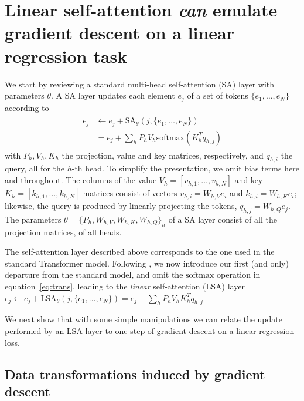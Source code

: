 \documentclass{article}
\newcommand{\sattn}{\text{SA}}
\newcommand{\lsattn}{\text{LSA}}
\def\eqref#1{equation~\ref{#1}}
\theoremstyle{plain}
\theoremstyle{definition}
\theoremstyle{remark}
\begin{document}
\section{Linear self-attention \textit{can} 
emulate gradient descent on a linear regression task}
\label{sect:construction}

We start by reviewing a standard multi-head self-attention (SA) layer with parameters $\theta$. A SA layer updates each element $e_j$ of a set of tokens $\{e_1,\ldots,e_N\}$ according to
\begin{align}
\begin{split}
\label{eq:trans}
e_j &\leftarrow e_j + \sattn_{\theta}(j, \{e_1,\ldots,e_N\}) \\ &= e_j + \sum_{h} P_hV_h \text{softmax}(K_h^{T}q_{h,j})
\end{split}
\end{align}
with $P_h, V_h, K_h$ the projection, value and key matrices, respectively, and $q_{h,i}$ the query, all for the $h$-th head. To simplify the presentation, we omit bias terms here and throughout. The columns of the value
$V_h  = [v_{h,1}, \dots, v_{h,N}]$ and key $K_h=[k_{h,1}, \dots, k_{h,N}]$ matrices consist of vectors $v_{h,i} = W_{h,V}e_i$ and  $k_{h,i} = W_{h,K}e_i$; likewise, the query is produced by linearly projecting the tokens, $q_{h,j} = W_{h,Q}e_j$. The parameters  $\theta = \{P_h, W_{h,V}, W_{h,K}, W_{h,Q}\}_h$ of a SA layer consist of all the projection matrices, of all heads.

The self-attention layer described above corresponds to the one used in the standard Transformer model. Following \citet{linear_transformers_fast_weight}, we now introduce our first (and only) departure from the standard model, and omit the $\text{softmax}$ operation in \eqref{eq:trans}, leading to the \textit{linear} self-attention (LSA) layer $e_j  \leftarrow e_j + \lsattn_{\theta}(j, \{e_1,\ldots,e_N\}) = e_j + \sum_{h} P_hV_hK_h^{T}q_{h,j}$

We next show that with some simple manipulations we can relate the update performed by an LSA layer to one step of gradient descent on a linear regression loss.

\subsection*{Data transformations induced by gradient descent}
\end{document}
